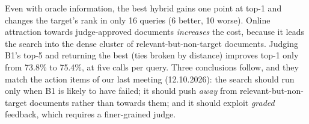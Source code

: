 Even with oracle information, the best hybrid gains one point at top-1 and changes the target's rank in only 16 queries (6 better, 10 worse). Online attraction towards judge-approved documents \emph{increases} the cost, because it leads the search into the dense cluster of relevant-but-non-target documents. Judging B1's top-5 and returning the best (ties broken by distance) improves top-1 only from 73.8\% to 75.4\%, at five calls per query. Three conclusions follow, and they match the action items of our last meeting (12.10.2026): the search should run only when B1 is likely to have failed; it should push \emph{away} from relevant-but-non-target documents rather than towards them; and it should exploit \emph{graded} feedback, which requires a finer-grained judge.
